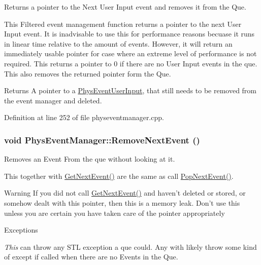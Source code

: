 Returns a pointer to the Next User Input event and removes it from the Que. 

This Filtered event management function returns a pointer to the next User Input event. It is inadvisable to use this for performance reasons becuase it runs in linear time relative to the amount of events. However, it will return an immediately usable pointer for case where an extreme level of performance is not required. This returns a pointer to 0 if there are no User Input events in the que. This also removes the returned pointer form the Que. \begin{DoxyReturn}{Returns}
A pointer to a \hyperlink{classPhysEventUserInput}{PhysEventUserInput}, that still needs to be removed from the event manager and deleted. 
\end{DoxyReturn}


Definition at line 252 of file physeventmanager.cpp.

\hypertarget{classPhysEventManager_ad040054bd9018ff0fd27ad78ec1e87fa}{
\subsubsection[{RemoveNextEvent}]{\setlength{\rightskip}{0pt plus 5cm}void PhysEventManager::RemoveNextEvent ()}}
\label{d5/dd7/classPhysEventManager_ad040054bd9018ff0fd27ad78ec1e87fa}


Removes an Event From the que without looking at it. 

This together with \hyperlink{classPhysEventManager_a1ab0da9e37f43c2c0d5af1dae26dcaf2}{GetNextEvent()} are the same as call \hyperlink{classPhysEventManager_a23091695829acad90c499f6724fe048c}{PopNextEvent()}. \begin{DoxyWarning}{Warning}
If you did not call \hyperlink{classPhysEventManager_a1ab0da9e37f43c2c0d5af1dae26dcaf2}{GetNextEvent()} and haven't deleted or stored, or somehow dealt with this pointer, then this is a memory leak. Don't use this unless you are certain you have taken care of the pointer appropriately 
\end{DoxyWarning}

\begin{DoxyExceptions}{Exceptions}
\item[{\em This}]can throw any STL exception a que could. Any with likely throw some kind of except if called when there are no Events in the Que. \end{DoxyExceptions}


